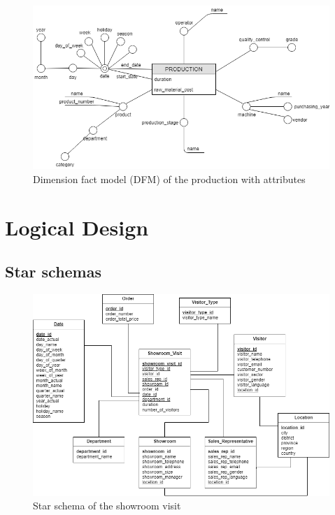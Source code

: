 \documentclass[11pt,a4paper,twoside]{article}
\begin{document}
\begin{figure}[h] 
        \centering
        \includegraphics[width=\columnwidth]{../images/DFM_Production.png}
        \caption{
                \label{fig:productionAttributes}  
                Dimension fact model (DFM) of the production with attributes 
        }
\end{figure}

\section{Logical Design}

\subsection{Star schemas}

\begin{figure}[h] 
        \centering
        \includegraphics[width=\columnwidth]{../images/Starschema_Showroom_visit.png}
        \caption{
                \label{fig:starschemaShowroom}  
                Star schema of the showroom visit
        }
\end{figure}
\end{document}
